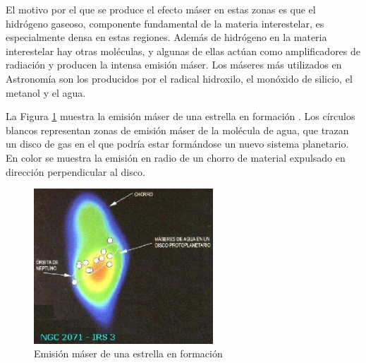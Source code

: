 El motivo por el que se produce el efecto m\'aser en estas zonas es que el hidr\'ogeno gaseoso, componente fundamental de la materia interestelar, es especialmente densa en estas regiones. Adem\'as de hidr\'ogeno en la materia interestelar hay otras mol\'eculas, y algunas de ellas act\'uan como amplificadores de radiaci\'on y producen la intensa emisi\'on m\'aser. Los máseres más utilizados en Astronomía son los producidos por el radical hidroxilo, el monóxido de silicio, el metanol y el agua.

La Figura \ref{fig:maser_astronomico} muestra la emisi\'on m\'aser de una estrella en formaci\'on \cite{fotoMaser}. Los c\'irculos blancos representan zonas de emisi\'on m\'aser de la mol\'ecula de agua, que trazan un disco de gas en el que podr\'ia estar form\'andose un nuevo sistema planetario. En color se muestra la emisi\'on en radio de un chorro de material expulsado en direcci\'on perpendicular al disco.

\begin{figure}[ht!]
 \centering
 \includegraphics[width=0.6\textwidth]{./Utils/maser_astronomico.png}
 \caption{Emisi\'on m\'aser de una estrella en formaci\'on}
 \label{fig:maser_astronomico}
\end{figure}

